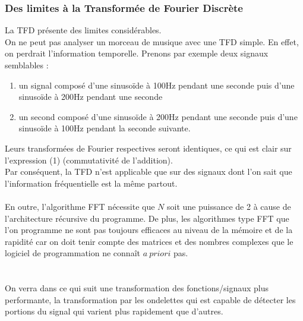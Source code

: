 \subsubsection{Des limites à la Transformée de Fourier Discrète}
La TFD présente des limites considérables.
\\
On ne peut pas analyser un morceau de musique avec une TFD simple. En effet, on perdrait l'information temporelle.
Prenons par exemple deux signaux semblables :
\begin{enumerate}
\item un signal composé d'une sinusoïde à 100Hz pendant une seconde puis d'une sinusoïde à 200Hz pendant une seconde
\item  un second composé d'une sinusoïde à 200Hz pendant une seconde puis d'une sinusoïde à 100Hz pendant la seconde suivante.
\end{enumerate}

Leurs transformées de Fourier respectives seront identiques, ce qui est clair sur l'expression (1) (commutativité de l'addition).
\\
Par conséquent, la TFD n'est applicable que sur des signaux dont l'on sait que l'information fréquentielle est la même partout.
\\ \\
En outre, l'algorithme FFT nécessite que $N$ soit une puissance de 2 à cause de l'architecture récursive du programme. De plus, les algorithmes type FFT que l'on programme ne sont pas toujours efficaces au niveau de la mémoire et de la rapidité car on doit tenir compte des matrices et des nombres complexes que le logiciel de programmation ne connaît $\mathit{a\: priori}$ pas.
\\ \\ \\

On verra dans ce qui suit une transformation des fonctions/signaux plus performante, la transformation par les ondelettes qui est capable de détecter les portions du signal qui varient plus rapidement que d'autres.


